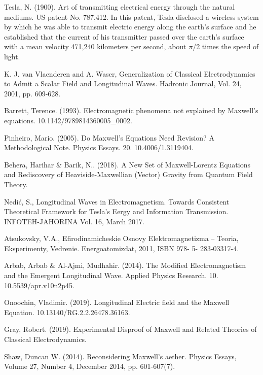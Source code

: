\documentclass[twoside,final]{article}
\begin{document}
{\begin{thebibliography}{99}
 Tesla, N. (1900). Art of transmitting electrical energy
through the natural mediums. US patent No. 787,412. In this patent, Tesla
disclosed a wireless system by which he was able to transmit electric energy
along the earth's surface and he established that the current of his transmitter
passed over the earth's surface with a mean velocity 471,240 kilometers per
second, about $\pi$/2 times the speed of light.





 K. J. van Vlaenderen and A. Waser, Generalization of
Classical Electrodynamics to Admit a Scalar Field and Longitudinal Waves.
Hadronic Journal, Vol. 24, 2001, pp. 609-628. 

 Barrett, Terence. (1993). Electromagnetic phenomena not
explained by Maxwell's equations. 10.1142/9789814360005\_0002. 

 Pinheiro, Mario. (2005). Do Maxwell's Equations Need
Revision? A Methodological Note. Physics Essays. 20. 10.4006/1.3119404. 

 Behera, Harihar \& Barik, N.. (2018). A New Set of
Maxwell-Lorentz Equations and Rediscovery of Heaviside-Maxwellian (Vector)
Gravity from Quantum Field Theory. 

 Nedi\'{c}, S., Longitudinal Waves in Electromagnetism.
Towards Consistent Theoretical Framework for Tesla's Eergy and Information
Transmission. INFOTEH-JAHORINA Vol. 16, March 2017. 


 Atsukovsky, V.A., Efirodinamicheskie Osnovy
Elektromagnetizma -- Teoria, Eksperimenty, Vedrenie. Energoatomizdat, 2011, ISBN
978- 5- 283-03317-4. 

 Arbab, Arbab \& Al-Ajmi, Mudhahir. (2014). The Modified
Electromagnetism and the Emergent Longitudinal Wave. Applied Physics Research.
10. 10.5539/apr.v10n2p45. 

 Onoochin, Vladimir. (2019). Longitudinal Electric field
and the Maxwell Equation. 10.13140/RG.2.2.26478.36163. 

 Gray, Robert. (2019). Experimental Disproof of Maxwell and
Related Theories of Classical Electrodynamics. 

 Shaw, Duncan W. (2014). Reconsidering Maxwell's aether.
Physics Essays, Volume 27, Number 4, December 2014, pp. 601-607(7). 



\end{thebibliography}}
\end{document}
